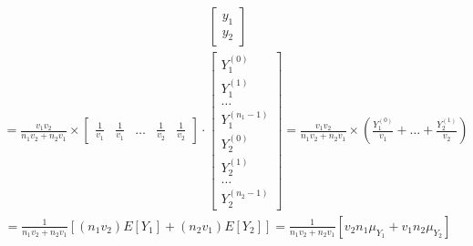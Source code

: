 \documentclass[12pt]{article}
\begin{document}
\begin{qsolve}[solution]
\begin{align*}
\begin{bmatrix}
            y_1 \\
            y_2
        \end{bmatrix}
    \end{align*}
    \begin{align*}
        = \frac{v_1 v_2}{n_1 v_2 + n_2 v_1} \times \begin{bmatrix}
            \frac{1}{v_1} & \frac{1}{v_1} & \hdots & \frac{1}{v_2} & \frac{1}{v_2}
        \end{bmatrix} \cdot
        \begin{bmatrix}
            Y_1^{(0)}     \\
            Y_1^{(1)}     \\
            \hdots        \\
            Y_1^{(n_1-1)} \\
            Y_2^{(0)}     \\
            Y_2^{(1)}     \\
            \hdots        \\
            Y_2^{(n_2-1)}
        \end{bmatrix}
        =  \frac{v_1 v_2}{n_1 v_2 + n_2 v_1} \times(\frac{Y_1^{(0)}}{v_1} + \hdots + \frac{Y_2^{(1)}}{v_2})
    \end{align*}
    \begin{align*}
        =  \frac{1}{n_1 v_2 + n_2 v_1}[(n_1 v_2) E[Y_1] + (n_2 v_1) E[Y_2]] = \frac{1}{n_1 v_2 + n_2 v_1}[v_2 n_1 \mu_{Y_1} + v_1 n_2 \mu_{Y_2} ]
    \end{align*}
\end{qsolve}
\end{document}
